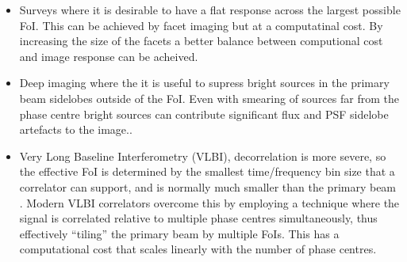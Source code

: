 \documentclass[useAMS,usenatbib]{mn2e}
\begin{document}
\begin{itemize}
\item Surveys where it is desirable to have a flat response across the largest
possible FoI. This can be achieved by facet imaging but at a computatinal cost.
By increasing the size of the facets a better balance between computional cost
and image response can be acheived.
\item Deep imaging where the it is useful to supress bright sources in the
primary beam sidelobes outside of the FoI. Even with smearing of sources far
from the phase centre bright sources can contribute significant flux and PSF
sidelobe artefacts to the image..
\item Very Long Baseline Interferometry (VLBI), decorrelation is more severe, so
the effective FoI is determined by the smallest time/frequency bin size that a
correlator can support, and is normally much smaller than the primary beam
\citep{keipema2015sfxc}. Modern VLBI correlators overcome this by employing a
technique where the signal is correlated relative to multiple phase centres
simultaneously, thus effectively ``tiling'' the primary beam by multiple FoIs.
This has a computational cost that scales linearly with the number of phase
centres.
\end{itemize}
%
\end{document}
